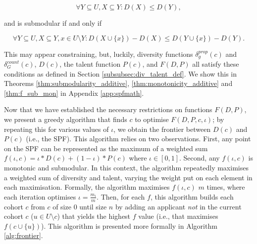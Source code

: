\begin{equation}
    \label{eq:mononicity}
    \forall Y \subseteq U, X \subseteq Y: D(X)\leq D(Y),
\end{equation}

\noindent and is submodular if and only if

\begin{equation}
    \label{eq:submodularity}
    \forall Y \subseteq U, X \subseteq Y, x \in U \setminus Y: D(X \cup \{x\}) - D(X) \leq D(Y \cup \{x\}) - D(Y).
\end{equation}

This may appear constraining, but, luckily, diversity functions $\delta_g^{prop}(c)$ and $\delta_G^{count}(c)$, $D(c)$, the talent function $P(c)$, and $F(D,P)$ all satisfy these conditions as defined in Section \ref{subsubsec:div_talent_def}. We show this in Theorems \ref{thm:submodularity_additive}, \ref{thm:monotonicity_additive} and \ref{thm:f_sub_mon} in Appendix \ref{app:spfmath}.

Now that we have established the necessary restrictions on functions $F(D,P)$, we present a greedy algorithm that finds $c$ to optimise $F(D, P, c, \iota)$; by repeating this for various values of $\iota$, we obtain the frontier between $D(c)$ and $P(c)$ (i.e., the SPF). This algorithm relies on two observations. First, any point on the SPF can be represented as the maximum of a weighted sum $f(\iota,c) = \iota*D(c) + (1-\iota)*P(c)$ where $\iota \in [0,1]$. Second, any $f(\iota,c)$ is monotonic and submodular. In this context, the algorithm repeatedly maximises a weighted sum of diversity and talent, varying the weight put on each element in each maximisation. Formally, the algorithm maximises $f(\iota,c)$ $m$ times, where each iteration optimises $\iota = \frac{m_i}{m}$. Then, for each $f$, this algorithm builds each cohort $c$ from $c$ of size $0$ until size $n$ by adding an applicant \textit{not} in the current cohort $c$ ($u \in U \setminus c$) that yields the highest $f$ value (i.e., that maximises $f(c \cup \{u\})$). This algorithm is presented more formally in Algorithm \ref{alg:frontier}. 

